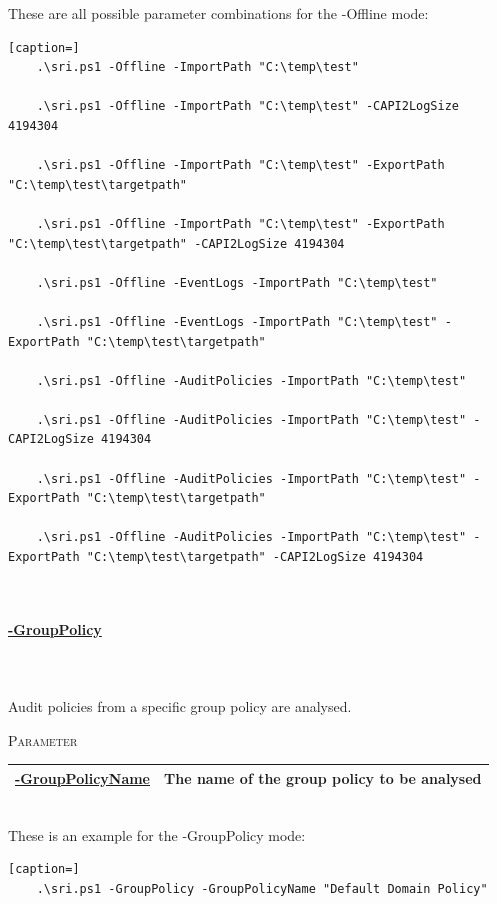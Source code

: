 These are all possible parameter combinations for the -Offline mode: \ \\
\begin{lstlisting}[caption=]
    .\sri.ps1 -Offline -ImportPath "C:\temp\test"

    .\sri.ps1 -Offline -ImportPath "C:\temp\test" -CAPI2LogSize 4194304
    
    .\sri.ps1 -Offline -ImportPath "C:\temp\test" -ExportPath "C:\temp\test\targetpath"
    
    .\sri.ps1 -Offline -ImportPath "C:\temp\test" -ExportPath "C:\temp\test\targetpath" -CAPI2LogSize 4194304
    
    .\sri.ps1 -Offline -EventLogs -ImportPath "C:\temp\test"
    
    .\sri.ps1 -Offline -EventLogs -ImportPath "C:\temp\test" -ExportPath "C:\temp\test\targetpath"
    
    .\sri.ps1 -Offline -AuditPolicies -ImportPath "C:\temp\test"
    
    .\sri.ps1 -Offline -AuditPolicies -ImportPath "C:\temp\test" -CAPI2LogSize 4194304
    
    .\sri.ps1 -Offline -AuditPolicies -ImportPath "C:\temp\test" -ExportPath "C:\temp\test\targetpath"
    
    .\sri.ps1 -Offline -AuditPolicies -ImportPath "C:\temp\test" -ExportPath "C:\temp\test\targetpath" -CAPI2LogSize 4194304
\end{lstlisting}\ \\
\begin{tcolorbox}
    \paragraph{\underline{-GroupPolicy}} \ \\\\ Audit policies from a specific group policy are analysed.
    \vspace{0.3cm}
    \begin{center}
        \textsc{Parameter}
    \end{center}
    \vspace{-0.5cm}
    \begin{table}[H]
        \def\arraystretch{2}
        \centering
        \begin{tabular}{ p{4cm}  p{10cm} } \hline
            \textbf{\underline{-GroupPolicyName}} & The name of the group policy to be analysed \\ \hline
        \end{tabular}
    \end{table}
\end{tcolorbox}\ \\
These is an example for the -GroupPolicy mode: \ \\
\begin{lstlisting}[caption=]
    .\sri.ps1 -GroupPolicy -GroupPolicyName "Default Domain Policy"
\end{lstlisting}

